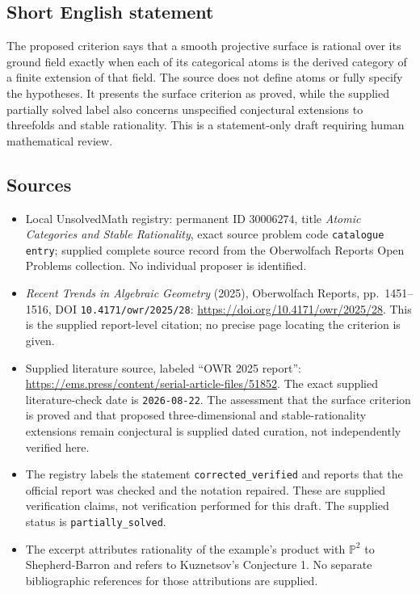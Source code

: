 \documentclass[11pt]{article}
\begin{document}
\subsection{Short English statement}
The proposed criterion says that a smooth projective surface is rational over its ground field exactly when each of its categorical atoms is the derived category of a finite extension of that field. The source does not define atoms or fully specify the hypotheses. It presents the surface criterion as proved, while the supplied partially solved label also concerns unspecified conjectural extensions to threefolds and stable rationality. This is a statement-only draft requiring human mathematical review.
\subsection{Sources}
\begin{itemize}
\item Local UnsolvedMath registry: permanent ID \(30006274\), title \emph{Atomic Categories and Stable Rationality}, exact source problem code \texttt{catalogue entry}; supplied complete source record from the Oberwolfach Reports Open Problems collection. No individual proposer is identified.
\item \emph{Recent Trends in Algebraic Geometry} (2025), Oberwolfach Reports, pp.\ 1451--1516, DOI \texttt{10.4171/owr/2025/28}: \url{https://doi.org/10.4171/owr/2025/28}. This is the supplied report-level citation; no precise page locating the criterion is given.
\item Supplied literature source, labeled ``OWR 2025 report'': \url{https://ems.press/content/serial-article-files/51852}. The exact supplied literature-check date is \texttt{2026-08-22}. The assessment that the surface criterion is proved and that proposed three-dimensional and stable-rationality extensions remain conjectural is supplied dated curation, not independently verified here.
\item The registry labels the statement \texttt{corrected\_verified} and reports that the official report was checked and the notation repaired. These are supplied verification claims, not verification performed for this draft. The supplied status is \texttt{partially\_solved}.
\item The excerpt attributes rationality of the example's product with \(\mathbb P^2\) to Shepherd-Barron and refers to Kuznetsov's Conjecture 1. No separate bibliographic references for those attributions are supplied.
\end{itemize}
\end{document}
